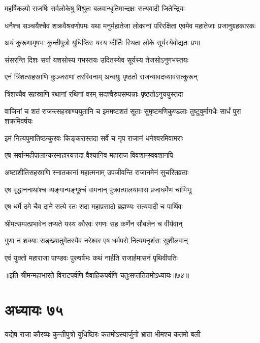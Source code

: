 \twolineshloka
{महर्षिकल्पो राजर्षिः सर्वलोकेषु विश्रुतः}
{बलवान्धृतिमान्दक्षः सत्यवादी जितेन्द्रियः}


\threelineshloka
{धनैश्च सञ्चयैश्चैव शक्रवैश्रवणोपमः}
{यथा मनुर्महातेजा लोकानां परिरक्षिता}
{एवमेव महातेजाः प्रजानुग्रहकारकः}


\twolineshloka
{अयं कुरूणामृषभः कुन्तीपुत्रो युधिष्ठिरः}
{यस्य कीर्तिः स्थिता लोके सूर्यस्येवोद्यतः प्रभा}


\twolineshloka
{संसरन्ति दिशः सर्वा यशसोस्य गभस्तयः}
{उदितस्येव सूर्यस्य तेजसोऽनुगभस्तयः}


\twolineshloka
{एनं त्रिंशत्सहस्राणि कुञ्जराणां तरस्विनाम्}
{अन्वयुः पृष्ठतो राजन्यावदध्यावसत्कुरून्}


\twolineshloka
{त्रिंशच्चैव सहस्राणि रथानां रथिनां वरम्}
{सदश्वैरुपसम्पन्नाः पृष्ठतोऽनुययुस्तदा}


\threelineshloka
{वाजिनां च शतं राजन्त्सहस्राण्ययुतानि च}
{इममष्टशतं सूताः सुमृष्टमणिकुण्डलाः}
{तुष्टुवुर्मागधैः सार्धं पुरा शक्रमिवर्षयः}


\twolineshloka
{इमं नित्यपुमातिष्ठन्कुरवः किङ्करास्तदा}
{सर्वे च नृप राजानं धनेश्वरमिवामराः}


\twolineshloka
{एष सर्वान्महीपालान्करमाहारयत्तदा}
{वैश्यानिव महाराज विवशान्स्ववशानपि}


\twolineshloka
{अष्टाशीतिसहस्राणि स्नातकानां महात्मनाम्}
{उपजीवन्ति राजानमेनं सुचरितव्रताः}


\twolineshloka
{एष वृद्धाननाथांश्च व्यङ्गान्पङ्गूश्चं वामनान्}
{पुत्रवत्पालयामास प्रजाधर्मेण चाभिभूः}


\twolineshloka
{एष धर्मे दमे चैव दाने सत्ये रतः सदा}
{महाप्रसादो ब्रह्मण्यः सत्यवादी च पार्थिवः}


\twolineshloka
{श्रीमत्सम्पत्प्रभावेन तप्यते यस्य कौरवः}
{रगणः सह कर्णेन सौबलेन च वीर्यवान्}


\twolineshloka
{गुणा न शक्याः सङ्ख्यातुमेतस्यैव नरेश्वर}
{एष धर्मपरो नित्यमनृशंसः सुशीलवान्}


\twolineshloka
{एवं युक्तो महाराजा पाण्डवः पुरुषर्षभः}
{कथं नार्हति राजार्हमासनं पृथिवीपतिः}

॥इति श्रीमन्महाभारते विराटपर्वणि वैवाहिकपर्वणि चतुःसप्ततितमोऽध्यायः॥७४॥

\chapter{अध्यायः ७५}

\twolineshloka
{यद्येष राजा कौरव्यः कुन्तीपुत्रो युधिष्ठिरः}
{कतमोऽस्यार्जुनो भ्राता भीमश्च कतमो बली}


